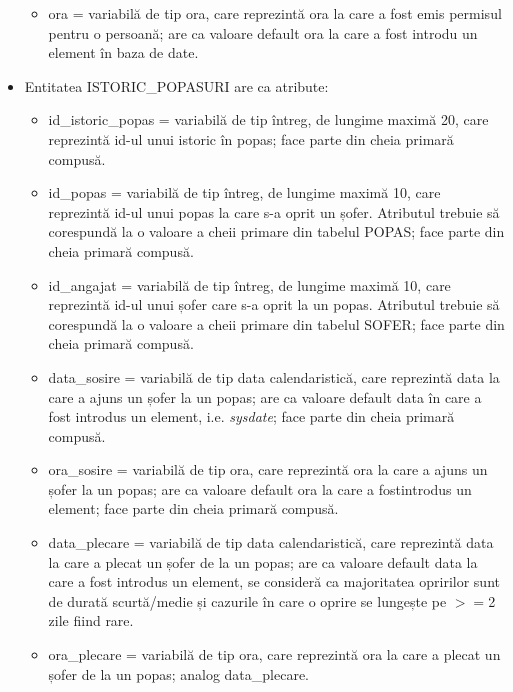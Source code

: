 \documentclass[12pt, a4paper]{article}
\begin{document}
\begin{itemize}
\begin{itemize}
            \item ora = variabilă de tip ora, care reprezintă ora la care a fost emis permisul pentru o persoană; are ca valoare default ora la care a fost introdu un element în baza de date.
        \end{itemize}
    \item Entitatea ISTORIC\_POPASURI are ca atribute:
        \begin{itemize}
            \item id\_istoric\_popas = variabilă de tip întreg, de lungime maximă 20, care reprezintă id-ul unui istoric în popas; face parte din cheia primară compusă.
            \item id\_popas = variabilă de tip întreg, de lungime maximă 10, care reprezintă id-ul unui popas la care s-a oprit un șofer. Atributul trebuie să corespundă la o valoare a cheii primare din tabelul POPAS; face parte din cheia primară compusă.
            \item id\_angajat = variabilă de tip întreg, de lungime maximă 10, care reprezintă id-ul unui șofer care s-a oprit la un popas. Atributul trebuie să corespundă la o valoare a cheii primare din tabelul SOFER; face parte din cheia primară compusă.
            \item data\_sosire = variabilă de tip data calendaristică, care reprezintă data la care a ajuns un șofer la un popas; are ca valoare default data în care a fost introdus un element, i.e. \emph{sysdate}; face parte din cheia primară compusă.
            \item ora\_sosire = variabilă de tip ora, care reprezintă ora la care a ajuns un șofer la un popas; are ca valoare default ora la care a fostintrodus un element; face parte din cheia primară compusă.
            \item data\_plecare = variabilă de tip data calendaristică, care reprezintă data la care a plecat un șofer de la un popas; are ca valoare default data la care a fost introdus un element, se consideră ca majoritatea opririlor sunt de durată scurtă/medie și cazurile în care o oprire se lungește pe $>=$2 zile fiind rare.
            \item ora\_plecare = variabilă de tip ora, care reprezintă ora la care a plecat un șofer de la un popas; analog data\_plecare.
        \end{itemize}
\end{itemize}
\end{document}
